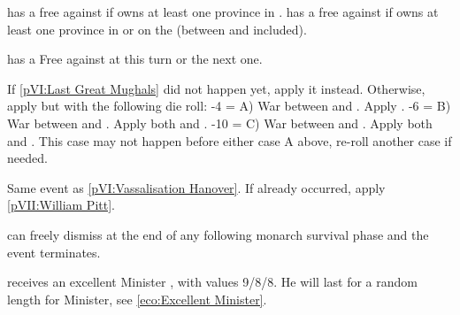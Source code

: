
\phevnt
\aparag \SUE has a free \CB against \RUS if \RUS owns at least one province in
\regionFinlande.
\aparag \RUS has a free \CB against \SUE if \SUE owns at least one province in
\regionFinlande or on the \regionBaltique (between \provinceNeva and
\provinceCourlande included).





\phevnt
\aparag \AUT has a Free \CB against \TUR at this turn or the next one.




\condition{}
\aparag If \ref{pVI:Last Great Mughals} did not happen yet, apply it instead.
\aparag Otherwise, apply  but with the following die
roll:
-4 = A) War between \paysmogol and \paysperse. Apply
.
-6 = B) War between \paysafghans and \paysperse. Apply both
 and .
-10 = C) War between \paysafghans and \paysmogol. Apply both
 and . This
case may not happen before either case A above, re-roll another case if
needed.




\phevnt
\aparag Same event as \ref{pVI:Vassalisation Hanover}.
\aparag If already occurred, apply \ref{pVII:William Pitt}.





\aparag \ANG can freely dismiss \ministrePitt at the end of any following
monarch survival phase and the event terminates.

\phevnt
\aparag \ANG receives an excellent Minister \ministrePitt, with values 9/8/8.
He will last for a random length for Minister, see \ref{eco:Excellent
  Minister}.

